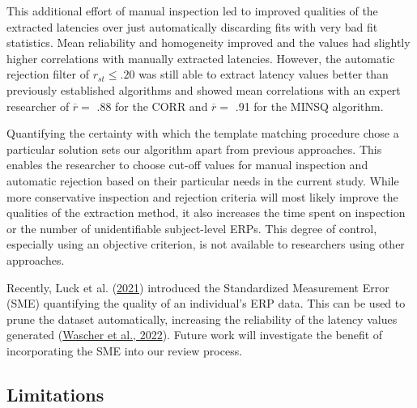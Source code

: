 \documentclass[
  man]{apa7}
\begin{document}
This additional effort of manual inspection led to improved qualities of the extracted latencies over just automatically discarding fits with very bad fit statistics. Mean reliability and homogeneity improved and the values had slightly higher correlations with manually extracted latencies. However, the automatic rejection filter of \(r_{st} \le .20\) was still able to extract latency values better than previously established algorithms and showed mean correlations with an expert researcher of \(\overline{r} =\) .88 for the CORR and \(\overline{r} =\) .91 for the MINSQ algorithm.

Quantifying the certainty with which the template matching procedure chose a particular solution sets our algorithm apart from previous approaches. This enables the researcher to choose cut-off values for manual inspection and automatic rejection based on their particular needs in the current study. While more conservative inspection and rejection criteria will most likely improve the qualities of the extraction method, it also increases the time spent on inspection or the number of unidentifiable subject-level ERPs. This degree of control, especially using an objective criterion, is not available to researchers using other approaches.

Recently, Luck et al. (\protect\hyperlink{ref-luck2021standardized}{2021}) introduced the Standardized Measurement Error (SME) quantifying the quality of an individual's ERP data. This can be used to prune the dataset automatically, increasing the reliability of the latency values generated (\protect\hyperlink{ref-wascher2022mental}{Wascher et al., 2022}). Future work will investigate the benefit of incorporating the SME into our review process.

\hypertarget{limitations}{%
\subsection{Limitations}\label{limitations}}
\end{document}
